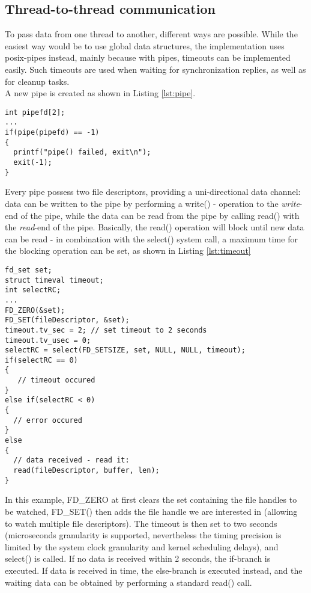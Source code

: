 \subsection{Thread-to-thread communication}
To pass data from one thread to another, different ways are possible. While the easiest way would be to use global data structures, the implementation uses 
\gls{posix}-pipes instead, mainly because with pipes, timeouts can be implemented easily. Such timeouts are used when waiting for synchronization replies, as well as for 
cleanup tasks.
\\
A new pipe is created as shown in Listing \ref{lst:pipe}.
\begin{lstlisting}[style=BashInputStyle,caption={Creating a pipe},label=lst:pipe]
int pipefd[2];
...
if(pipe(pipefd) == -1)
{
  printf("pipe() failed, exit\n");
  exit(-1);
}
\end{lstlisting}
Every pipe possess two file descriptors, providing a uni-directional data channel: data can be written to the pipe by performing a write() - operation to the \textit{write}-end of the
pipe, while the data can be read from the pipe by calling read() with the \textit{read}-end of the pipe. Basically, the read() operation will block until new data can be read - in 
combination with the select() system call, a maximum time for the blocking operation can be set, as shown in Listing \ref{lst:timeout}
\begin{lstlisting}[style=BashInputStyle,caption={Creating a pipe},label=lst:timeout]
fd_set set;
struct timeval timeout;
int selectRC;
...
FD_ZERO(&set);
FD_SET(fileDescriptor, &set);
timeout.tv_sec = 2;	// set timeout to 2 seconds
timeout.tv_usec = 0;
selectRC = select(FD_SETSIZE, set, NULL, NULL, timeout);
if(selectRC == 0)
{
   // timeout occured
}
else if(selectRC < 0)
{
  // error occured
}
else
{
  // data received - read it:
  read(fileDescriptor, buffer, len);
}
\end{lstlisting}
In this example, FD\_ZERO at first clears the set containing the file handles to be watched, FD\_SET() then adds the file handle we are interested in (allowing to watch multiple file
descriptors). The timeout is then set to two seconds 
(microseconds granularity is supported, nevertheless the timing precision is limited by the system clock granularity and kernel scheduling delays), and select() is called. If no data is
received within 2 seconds, the if-branch is executed. If data is received in time, the else-branch is executed instead, and the waiting data can be obtained by performing a standard
read() call.

